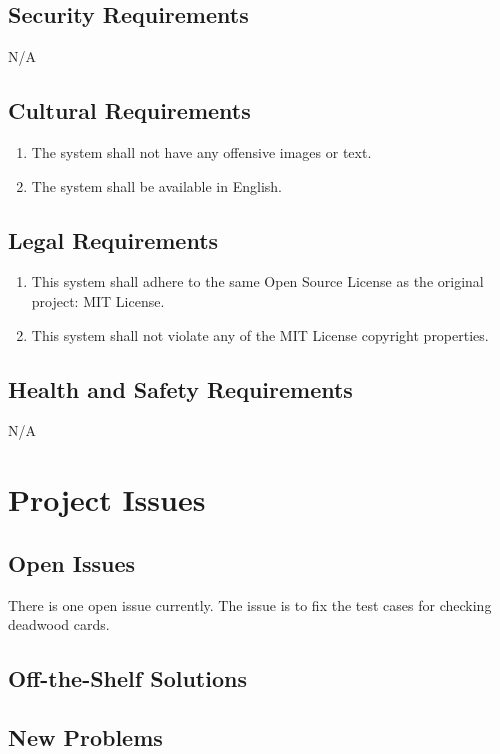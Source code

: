 \documentclass[12pt, titlepage]{article}
\begin{document}
\subsection{Security Requirements}
N/A

\subsection{Cultural Requirements}
\begin{enumerate}[{C}.1]
    \item The system shall not have any offensive images or text.
    \item The system shall be available in English.
\end{enumerate}

\subsection{Legal Requirements}
\begin{enumerate}[{L}.1]
    \item This system shall adhere to the same Open Source License as the original project: MIT License.
    \item This system shall not violate any of the MIT License copyright properties.
\end{enumerate}

\subsection{Health and Safety Requirements}
N/A

\section{Project Issues}
\subsection{Open Issues}
There is one open issue currently. The issue is to fix the test cases for checking deadwood cards. 

\subsection{Off-the-Shelf Solutions}

\subsection{New Problems}
\end{document}
